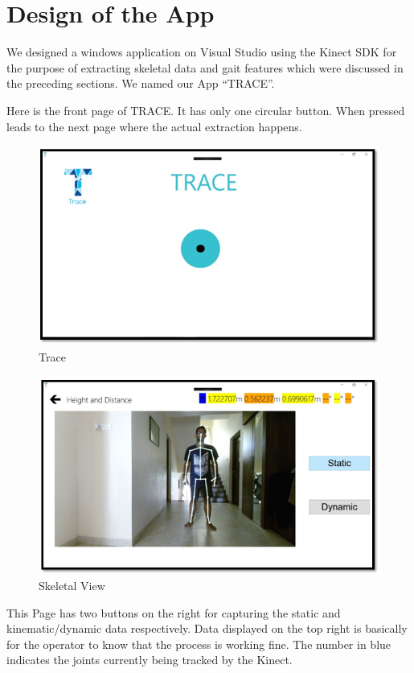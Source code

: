 \newpage
\section{Design of the App } \label{ Design of the App} 
\noindent We designed a windows application on Visual Studio using the Kinect SDK for the purpose of extracting skeletal data and gait features which were discussed in the preceding sections. We named our App “TRACE”.

\noindent Here is the front page of TRACE. It has only one circular button. When pressed leads to the next page where the actual extraction happens.

\begin{figure}[h]
\centering
\includegraphics[scale=0.8]{trace.png}
\caption{Trace}
\end{figure} 

\begin{figure}[h]
\centering
\includegraphics[scale=0.8]{john.png}
\caption{Skeletal View}
\end{figure}
\newpage
\noindent This Page has two buttons on the right for capturing the static and kinematic/dynamic data respectively. Data displayed on the top right is basically for the operator to know that the process is working fine. The number in blue indicates the joints currently being tracked by the Kinect. 

